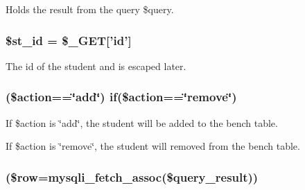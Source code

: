 \-Holds the result from the query \$query. \hypertarget{updateBenchDB_8php_ab68b86e23fd74e101c03130a49b24f66}{
\subsubsection[{\$st\-\_\-id}]{\setlength{\rightskip}{0pt plus 5cm}\$st\-\_\-id = \$\-\_\-\-G\-E\-T\mbox{[}'id'\mbox{]}}}\label{updateBenchDB_8php_ab68b86e23fd74e101c03130a49b24f66}
\-The id of the student and is escaped later. \hypertarget{updateBenchDB_8php_a0c1f2915e12defa9f4d515347d884dee}{
\subsubsection[{if}]{ (\$action==\char`\"{}add\char`\"{}) if(\$action==\char`\"{}remove\char`\"{})}}\label{updateBenchDB_8php_a0c1f2915e12defa9f4d515347d884dee}
\-If \$action is \char`\"{}add\char`\"{}, the student will be added to the bench table.

\-If \$action is \char`\"{}remove\char`\"{}, the student will removed from the bench table. \hypertarget{updateBenchDB_8php_abbca5b4e0da1a7b7e95bb777ad93473d}{
\subsubsection[{while}]{(\$row=mysqli\-\_\-fetch\-\_\-assoc(\$query\-\_\-result))}}\label{updateBenchDB_8php_abbca5b4e0da1a7b7e95bb777ad93473d}
